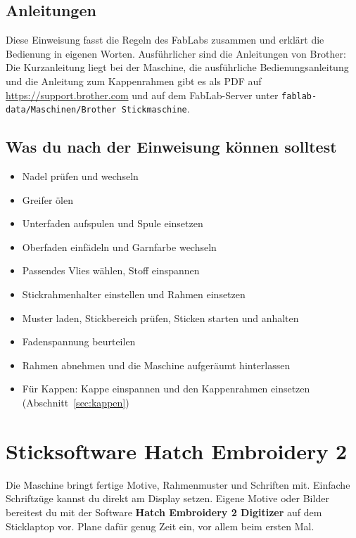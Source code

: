 \documentclass{\basedir/fablab-document}
\begin{document}
	\subsection{Anleitungen}
	Diese Einweisung fasst die Regeln des FabLabs zusammen und erklärt die Bedienung in eigenen Worten. Ausführlicher sind die Anleitungen von Brother: Die Kurzanleitung liegt bei der Maschine, die ausführliche Bedienungsanleitung und die Anleitung zum Kappenrahmen gibt es als PDF auf \url{https://support.brother.com} und auf dem FabLab-Server unter \texttt{fablab-data/Maschinen/Brother Stickmaschine}.

	\subsection{Was du nach der Einweisung können solltest}
	\begin{itemize}
		\item Nadel prüfen und wechseln
		\item Greifer ölen
		\item Unterfaden aufspulen und Spule einsetzen
		\item Oberfaden einfädeln und Garnfarbe wechseln
		\item Passendes Vlies wählen, Stoff einspannen
		\item Stickrahmenhalter einstellen und Rahmen einsetzen
		\item Muster laden, Stickbereich prüfen, Sticken starten und anhalten
		\item Fadenspannung beurteilen
		\item Rahmen abnehmen und die Maschine aufgeräumt hinterlassen
		\item Für Kappen: Kappe einspannen und den Kappenrahmen einsetzen (Abschnitt~\ref{sec:kappen})
	\end{itemize}

	\section{Sticksoftware Hatch Embroidery 2}

	Die Maschine bringt fertige Motive, Rahmenmuster und Schriften mit. Einfache Schriftzüge kannst du direkt am Display setzen. Eigene Motive oder Bilder bereitest du mit der Software \textbf{Hatch Embroidery 2 Digitizer} auf dem Sticklaptop vor. Plane dafür genug Zeit ein, vor allem beim ersten Mal.
\end{document}
